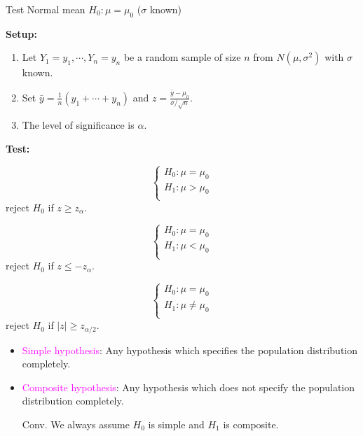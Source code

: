 \begin{frame}{Test Normal mean $H_0: \mu=\mu_0$ ($\sigma$ known)}

{\bf Setup:~}
\begin{enumerate}
 \item Let $Y_1=y_1,\cdots,Y_n=y_n$ be a random sample of size $n$ from $N(\mu,\sigma^2)$ with $\sigma$ known.
  \item Set $\bar{y}=\frac{1}{n}(y_1+\cdots+y_n)$ and $z=\frac{\bar{y}-\mu_0}{\sigma/\sqrt{n}}$.
 \item The level of significance is $\alpha$.
\end{enumerate}

\vfill\pause
{\bf Test:}\\
\begin{minipage}{0.3\textwidth}
 \[
 \begin{cases}
     H_0: \mu= \mu_0 \\
     H_1: \mu> \mu_0 \\
 \end{cases}
 \]
 reject $H_0$ if $z\ge z_\alpha$.
\end{minipage}
\hfill
\begin{minipage}{0.3\textwidth}
 \[
 \begin{cases}
     H_0: \mu= \mu_0 \\
     H_1: \mu< \mu_0 \\
 \end{cases}
 \]
 reject $H_0$ if $z\le -z_\alpha$.
\end{minipage}
\hfill
\begin{minipage}{0.3\textwidth}
 \[
 \begin{cases}
     H_0: \mu= \mu_0 \\
     H_1: \mu\ne \mu_0 \\
 \end{cases}
  \]
  reject $H_0$ if $|z|\ge z_{\alpha/2}$.
\end{minipage}
\end{frame}
\begin{frame}
\begin{itemize}
  \item \textcolor{magenta}{Simple hypothesis}: Any hypothesis which specifies the population distribution completely.\\[1em]
  \item \textcolor{magenta}{Composite hypothesis}: Any hypothesis which does not specify the population distribution completely. \\[2em]
	\item[Conv.] We always assume $H_0$ is simple and $H_1$ is composite.
\end{itemize}

\end{frame}
